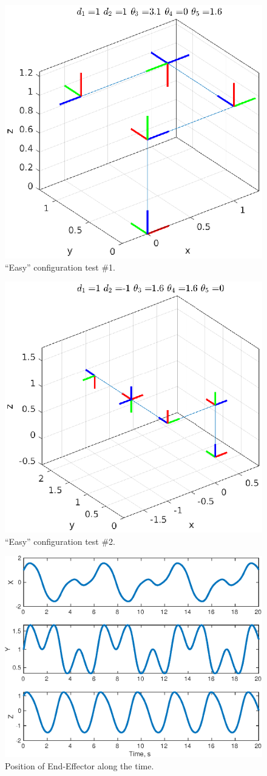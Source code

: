 \documentclass[a4paper,10pt]{article}
\begin{document}
\begin{figure}[H] \label{fig:conf1}
 \centering
 \includegraphics[width=0.7\linewidth]{configuration1.eps}
 \caption{``Easy'' configuration test \#1.}
\end{figure}

\begin{figure}[H] \label{fig:conf2}
 \centering
 \includegraphics[width=0.7\linewidth]{configuration2.eps}
 \caption{``Easy'' configuration test \#2.}
\end{figure}

\begin{figure}[H] \label{fig:}
 \centering
 \includegraphics[width=0.7\linewidth]{EndETrajTime.eps}
 \caption{Position of End-Effector along the time.}
\end{figure}
\end{document}
